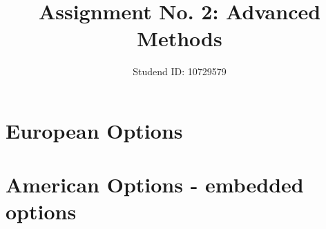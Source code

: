 \documentclass{amsart}
\begin{document}
	
	\title{Assignment No. 2: Advanced Methods}
	\author{Studend ID: 10729579}
	\maketitle
	
	\vspace{-1cm}
	\section{European Options}
	
	
	\vspace{1cm}
	\section{American Options - embedded options}
	
	
\end{document}
